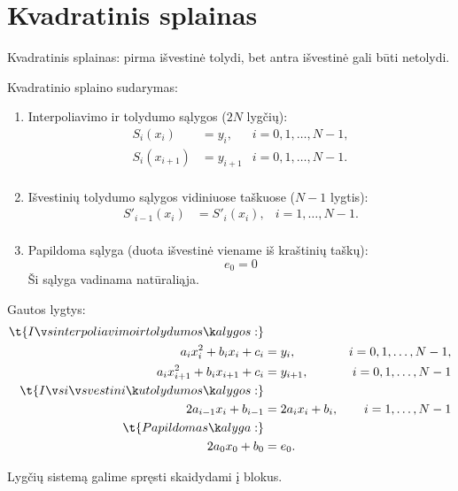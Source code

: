 \section{Kvadratinis splainas}


Kvadratinis splainas: pirma išvestinė tolydi, bet antra išvestinė gali būti
netolydi.



Kvadratinio splaino sudarymas:
\begin{enumerate}
  \item Interpoliavimo ir tolydumo sąlygos ($2N$ lygčių):
    \begin{align*}
      S_{i}(x_{i}) &= y_{i}, & i = 0,1,\ldots,N-1,\\
      S_{i}(x_{i+1}) &= y_{i+1} & i = 0,1,\ldots,N-1.\\
    \end{align*}
  \item Išvestinių tolydumo sąlygos vidiniuose taškuose ($N-1$ lygtis):
    \begin{align*}
      S'_{i-1}(x_{i}) &= S'_{i}(x_{i}), & i = 1,\ldots,N-1.\\
    \end{align*}
  \item Papildoma sąlyga (duota išvestinė viename iš kraštinių taškų):
    \begin{equation*}
      e_{0} = 0
    \end{equation*}
    Ši sąlyga vadinama natūraliąja.
\end{enumerate}

Gautos lygtys:
\begin{align*}
  \t{Iš interpoliavimo ir tolydumo sąlygos:} \\
  a_{i}x_{i}^{2} + b_{i}x_{i} + c_{i} &= y_{i}, & i = 0,1,\ldots,N-1, \\
  a_{i}x_{i+1}^{2} + b_{i}x_{i+1} + c_{i} &= y_{i+1}, & i = 0,1,\ldots,N-1 \\
  \t{Iš išvestinių tolydumo sąlygos:} \\
  2a_{i-1}x_{i} + b_{i-1} &= 2a_{i}x_{i} + b_{i}, & i = 1,\ldots,N-1 \\
  \t{Papildoma sąlyga:} \\
  2a_{0}x_{0} + b_{0} &= e_{0}.
\end{align*}


Lygčių sistemą galime spręsti skaidydami į blokus.

